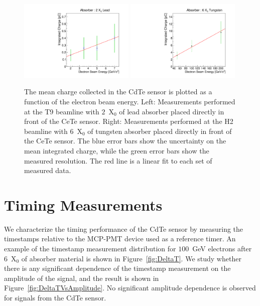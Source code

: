 \documentclass[preprint,1p]{elsarticle}
\begin{document}
\begin{figure}[htbp] 
\centering
\includegraphics[width=0.49\textwidth]{figures/ChargeVsEnergyAt2X0.pdf} 
\includegraphics[width=0.49\textwidth]{figures/ChargeVsEnergyAt6X0.pdf} 
\caption{ The mean charge collected in the CdTe sensor is plotted as a function
of the electron beam energy. Left: Measurements performed at the T9 beamline
with $2$~$\mathrm{X}_{0}$ of lead absorber placed directly in front of the 
CeTe sensor. Right: Measurements performed at the H2 beamline
with $6$~$\mathrm{X}_{0}$ of tungsten absorber placed directly in front of the 
CeTe sensor. The blue error bars show the uncertainty on the mean integrated charge,
while the green error bars show the measured resolution. The red line is a 
linear fit to each set of measured data. } 
\label{fig:ChargeVsEnergy} 
\end{figure} 



\section{Timing Measurements} 
\label{sec:timing} 

We characterize the timing performance of the CdTe sensor by measuring the timestamps
relative to the MCP-PMT device used as a reference timer. An example of the timestamp
measurement distribution for $100$~GeV electrons after $6$~$\mathrm{X}_{0}$ of absorber
material is shown in Figure~\ref{fig:DeltaT}. We study whether there is any significant
dependence of the timestamp measurement on the amplitude of the signal, and the
result is shown in Figure~\ref{fig:DeltaTVsAmplitude}. No significant amplitude dependence
is observed for signals from the CdTe sensor.
\end{document}
